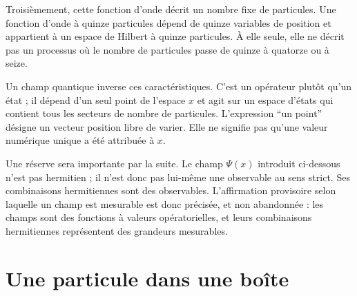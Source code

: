 Troisièmement, cette fonction d’onde décrit un nombre fixe de particules. Une fonction d’onde à quinze particules dépend de quinze variables de position et appartient à un espace de Hilbert à quinze particules. À elle seule, elle ne décrit pas un processus où le nombre de particules passe de quinze à quatorze ou à seize.

Un champ quantique inverse ces caractéristiques. C’est un opérateur plutôt qu’un état ; il dépend d’un seul point de l’espace \(x\) et agit sur un espace d’états qui contient tous les secteurs de nombre de particules. L’expression ``un point'' désigne un vecteur position libre de varier. Elle ne signifie pas qu’une valeur numérique unique a été attribuée à \(x\).

Une réserve sera importante par la suite. Le champ \(\Psi(x)\) introduit ci-dessous n’est pas hermitien ; il n’est donc pas lui-même une observable au sens strict. Ses combinaisons hermitiennes sont des observables. L’affirmation provisoire selon laquelle un champ est mesurable est donc précisée, et non abandonnée : les champs sont des fonctions à valeurs opératorielles, et leurs combinaisons hermitiennes représentent des grandeurs mesurables.

\begin{classroomqa}\end{classroomqa}

\begin{classroomqa}\end{classroomqa}

\section{Une particule dans une boîte}

